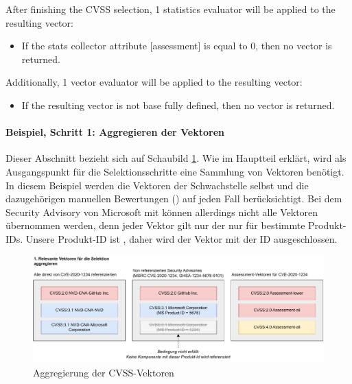 \noindent After finishing the CVSS selection, 1 statistics evaluator will be applied to the resulting vector:
\begin{itemize}[noitemsep]
    \item If the stats collector attribute [assessment] is equal to 0, then no vector is returned.
\end{itemize}
Additionally, 1 vector evaluator will be applied to the resulting vector:
\begin{itemize}[noitemsep]
    \item If the resulting vector is not base fully defined, then no vector is returned.
\end{itemize}

\newpage
\paragraph{Beispiel, Schritt 1: Aggregieren der Vektoren} \label{par:projektbericht-loesungsweg-cvss-selection-example-step-1}

Dieser Abschnitt bezieht sich auf Schaubild \ref{fig:cvss-selection-process-selection-1}.
Wie im Hauptteil erklärt, wird als Ausgangspunkt für die Selektionsschritte eine Sammlung von Vektoren benötigt.
In diesem Beispiel werden die Vektoren der Schwachstelle  selbst und die dazugehörigen manuellen Bewertungen () auf jeden Fall berücksichtigt.
Bei dem Security Advisory von Microsoft mit  können allerdings nicht alle Vektoren übernommen werden, denn jeder Vektor gilt nur der nur für bestimmte Produkt-IDs.
Unsere Produkt-ID ist , daher wird der Vektor mit der ID  ausgeschlossen.

\begin{figure}[htbp] %
    \centering
    \includegraphics[width=1\textwidth, keepaspectratio]{res/grafiken/cvss-selection-process-selection-1}
    \caption{Aggregierung der CVSS-Vektoren}
    \label{fig:cvss-selection-process-selection-1}
\end{figure}

